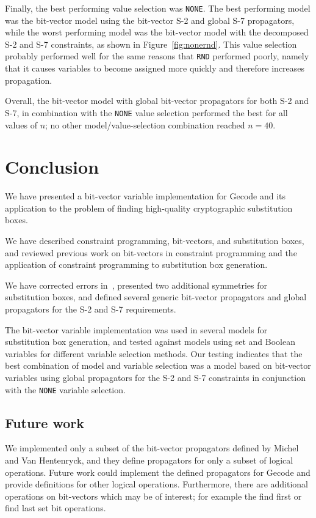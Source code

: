 \documentclass[a4paper,10pt,twoside,openright]{book}
\newcommand*\cd[1]{\texttt{#1}}
\begin{document}
Finally, the best performing value selection was \cd{NONE}.
The best performing model
was the bit-vector model using the bit-vector S-2 and global S-7 propagators, while
the worst performing model was the bit-vector model with the decomposed S-2 and S-7 constraints,
as shown in Figure~\ref{fig:nonernd}.
This value selection probably performed well for the same reasons that \cd{RND} performed poorly, 
namely that it causes variables to become assigned more quickly and therefore increases propagation.

Overall, the bit-vector model with global bit-vector propagators for both S-2 and S-7,
in combination with the \cd{NONE} value selection performed the best for
all values of $n$; no other model/value-selection combination reached $n=40$.


\chapter{Conclusion}
\label{sec:conclusion}

We have presented a bit-vector variable implementation for Gecode
and its application to the problem of 
finding high-quality cryptographic substitution boxes. 

We have described constraint programming, bit-vectors, and substitution boxes,
and 
reviewed previous work on bit-vectors in constraint programming
and the application of constraint programming to substitution box generation.

We have corrected errors in~\cite{sboxes},
presented two additional symmetries for substitution boxes,
and defined several generic bit-vector propagators and global propagators
for the S-2 and S-7 requirements.

The bit-vector variable implementation 
was used in several models for 
substitution box generation,
and tested against
models using set and Boolean variables
for
different variable selection methods.
Our testing indicates that
the best combination of model and variable selection was 
a model based on bit-vector variables
using global propagators for the S-2 and S-7 constraints
in conjunction with the \cd{NONE} variable selection.

\section{Future work}

We implemented only a subset of the bit-vector propagators
defined by 
Michel and Van Hentenryck,
and they define propagators for only a subset of logical 
operations. 
Future work could implement the defined propagators for Gecode
and provide definitions for other logical operations.
Furthermore, there are additional operations on bit-vectors which
may be of interest; for example 
the
find first or find last set bit operations.
\end{document}
